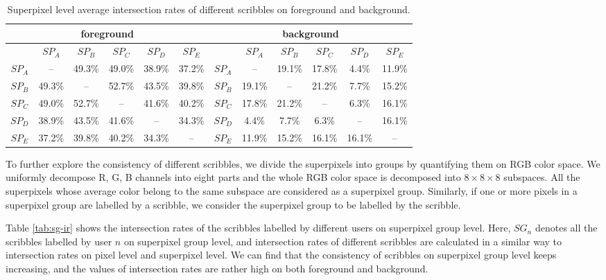 \documentclass[runningheads,a4paper]{llncs}
\begin{document}
\begin{table}[!h]
\centering
\vspace{-0.2cm}
\caption{Superpixel level average intersection rates of different scribbles on foreground and background.}
\begin{tabular}{c|c|c|c|c|c||c|c|c|c|c|c}
\hline
\multicolumn{6}{c||}{foreground} &\multicolumn{6}{c}{background}\\
\hline
& $SP_{A}$ & $SP_{B}$ & $SP_{C}$ & $SP_{D}$ & $SP_{E}$ && $SP_{A}$ & $SP_{B}$ & $SP_{C}$ & $SP_{D}$ & $SP_{E}$ \\
\hline
$SP_{A}$ & -- & 49.3\% & 49.0\% & 38.9\% & 37.2\% & $SP_{A}$ & -- & 19.1\% & 17.8\% & 4.4\% & 11.9\% \\
\hline
$SP_{B}$ & 49.3\% & -- & 52.7\% & 43.5\% & 39.8\% & $SP_{B}$ & 19.1\% & -- & 21.2\% & 7.7\% & 15.2\% \\
\hline
$SP_{C}$ & 49.0\% & 52.7\% & -- & 41.6\% & 40.2\% & $SP_{C}$ & 17.8\% & 21.2\% & -- & 6.3\% & 16.1\% \\
\hline
$SP_{D}$ & 38.9\% & 43.5\% & 41.6\% & -- & 34.3\% & $SP_{D}$ & 4.4\% & 7.7\% & 6.3\% & -- & 16.1\% \\
\hline
$SP_{E}$ & 37.2\% & 39.8\% & 40.2\% & 34.3\% &--  & $SP_{E}$ & 11.9\% & 15.2\% & 16.1\% & 16.1\% & --  \\
\hline
\end{tabular}
\label{tab:sp-ir}
\end{table}

To further explore the consistency of different scribbles, we divide the superpixels into groups by quantifying them on RGB color space. We uniformly decompose R, G, B channels into eight parts and the whole RGB color space is decomposed into $8\times 8\times 8$ subspaces. All the superpixels whose average color belong to the same subspace are considered as a superpixel group. Similarly, if one or more pixels in a superpixel group are labelled by a scribble, we consider the superpixel group to be labelled by the scribble.

Table \ref{tab:sg-ir} shows the intersection rates of the scribbles labelled by different users on superpixel group level. Here, $SG_{n}$ denotes all the scribbles labelled by user $n$ on superpixel group level, and intersection rates of different scribbles are calculated in a similar way to intersection rates on pixel level and superpixel level. We can find that the consistency of scribbles on superpixel group level keeps increasing, and the values of intersection rates are rather high on both foreground and background.
\end{document}
